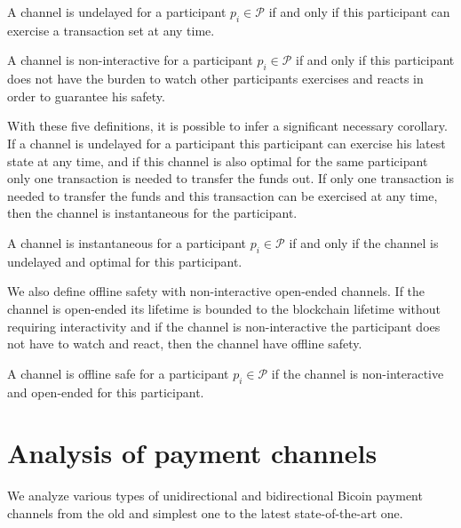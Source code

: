 \documentclass{llncs}
\begin{document}
\begin{definition}[Undelayed] A channel is undelayed for a participant $p_i \in \mathcal{P}$ if and only if this participant can exercise a transaction set at any time.
\end{definition}

\begin{definition} A channel is non-interactive for a participant $p_i \in \mathcal{P}$ if and only if this participant does not have the burden to watch other participants exercises and reacts in order to guarantee his safety.
\end{definition}

With these five definitions, it is possible to infer a significant necessary corollary. If a channel is undelayed for a participant this participant can exercise his latest state at any time, and if this channel is also optimal for the same participant only one transaction is needed to transfer the funds out. If only one transaction is needed to transfer the funds and this transaction can be exercised at any time, then the channel is instantaneous for the participant.

\begin{corollary}[Instantaneous] A channel is instantaneous for a participant $p_i \in \mathcal{P}$ if and only if the channel is undelayed and optimal for this participant.
\end{corollary}

We also define offline safety with non-interactive open-ended channels. If the channel is open-ended its lifetime is bounded to the blockchain lifetime without requiring interactivity and if the channel is non-interactive the participant does not have to watch and react, then the channel have offline safety.

\begin{corollary} A channel is offline safe for a participant $p_i \in \mathcal{P}$ if the channel is non-interactive and open-ended for this participant.
\end{corollary}

\section{Analysis of payment channels}

We analyze various types of unidirectional and bidirectional Bicoin payment channels from the old and simplest one to the latest state-of-the-art one.
\end{document}
